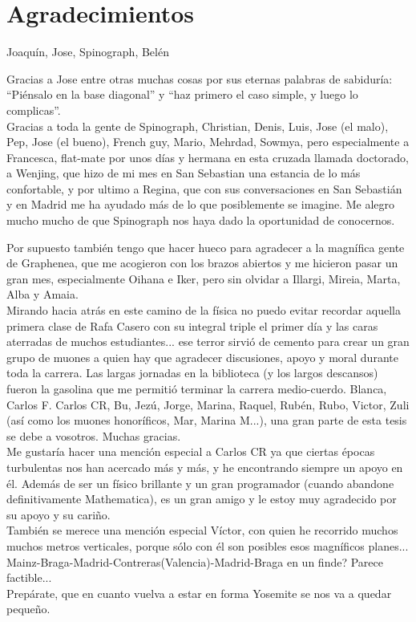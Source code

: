\chapter*{Agradecimientos}
Joaquín, Jose, Spinograph, Belén %


Gracias a Jose entre otras muchas cosas por sus eternas palabras de sabiduría: ``Piénsalo en la base diagonal'' y ``haz primero el caso simple, y luego lo complicas''.\\

Gracias a toda la gente de Spinograph, Christian, Denis, Luis, Jose (el malo), Pep, Jose (el bueno), French guy, Mario, Mehrdad, Sowmya, pero especialmente a Francesca, flat-mate por unos días y hermana en esta cruzada llamada doctorado, a Wenjing, que hizo de mi mes en San Sebastian una estancia de lo más confortable, y por ultimo a Regina, que con sus conversaciones en San Sebastián y en Madrid me ha ayudado más de lo que posiblemente se imagine. Me alegro mucho mucho de que Spinograph nos haya dado la oportunidad de conocernos.

Por supuesto también tengo que hacer hueco para agradecer a la magnífica gente de Graphenea, que me acogieron con los brazos abiertos y me hicieron pasar un gran mes, especialmente Oihana e Iker, pero sin olvidar a Illargi, Mireia, Marta, Alba y Amaia.\\


Mirando hacia atrás en este camino de la física no puedo evitar recordar aquella primera clase de Rafa Casero con su integral triple el primer día y las caras aterradas de muchos estudiantes... ese terror sirvió de cemento para crear un gran grupo de muones a quien hay que agradecer discusiones, apoyo y moral durante toda la carrera.
Las largas jornadas en la biblioteca (y los largos descansos) fueron la gasolina que me permitió terminar la carrera medio-cuerdo. Blanca, Carlos F. Carlos CR, Bu, Jezú, Jorge, Marina, Raquel, Rubén, Rubo, Victor, Zuli (así como los muones honoríficos, Mar, Marina M...), una gran parte de esta tesis se debe a vosotros. Muchas gracias.\\

Me gustaría hacer una mención especial a Carlos CR ya que ciertas épocas turbulentas nos han acercado más y más, y he encontrando siempre un apoyo en él. Además de ser un físico brillante y un gran programador (cuando abandone definitivamente Mathematica), es un gran amigo y le estoy muy agradecido por su apoyo y su cariño.\\

También se merece una mención especial Víctor, con quien he recorrido muchos muchos metros verticales, porque sólo con él son posibles esos magníficos planes...\\
Mainz-Braga-Madrid-Contreras(Valencia)-Madrid-Braga en un finde? Parece factible...\\
Prepárate, que en cuanto vuelva a estar en forma Yosemite se nos va a quedar pequeño.\\


